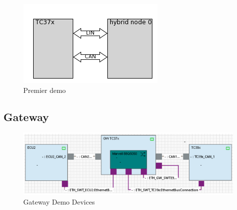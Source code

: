 \begin{figure}[!htb]
 \centering
 \includegraphics[]{img/first_demo_testbench.png}
 \caption{Premier demo}
 \label{fig:first-demo-diagram}
\end{figure}

\subsection{Gateway}

\begin{figure}[!htb]
 \centering
 \includegraphics[width=\textwidth]{img/GWDemoConnections.PNG}
 \caption{Gateway Demo Devices}
 \label{fig:devices-diagram}
\end{figure}


